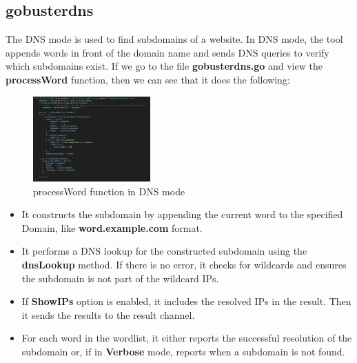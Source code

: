 \documentclass[12 pt]{article}
\begin{document}
\subsection{gobusterdns}
The DNS mode is used to find subdomains of a website. In DNS mode,
the tool appends words in front of the domain name and sends DNS queries to verify which subdomains exist. If we go to the file \textbf{gobusterdns.go} and view the \textbf{processWord} function, then we can see that it does the following:
\begin{figure}[!htbp]
    \centering
    \includegraphics[width=0.4\textwidth]{Gobusterdns_ProcessWord.png}
    \caption{processWord function in DNS mode}
    \label{fig: Gobusterdns processWord}
\end{figure}
\begin{itemize}
    \item It constructs the subdomain by appending the current word to the specified Domain, like \textbf{word.example.com} format.
    \item It performs a DNS lookup for the constructed subdomain using the \textbf{dnsLookup} method. If there is no error, it checks for wildcards and ensures the subdomain is not part of the wildcard IPs.
    \item If \textbf{ShowIPs} option is enabled, it includes the resolved IPs in the result. Then it sends the results to the result channel.
    \item For each word in the wordlist, it either reports the successful resolution of the subdomain or, if in \textbf{Verbose} mode, reports when a subdomain is not found.
\end{itemize}
\end{document}
